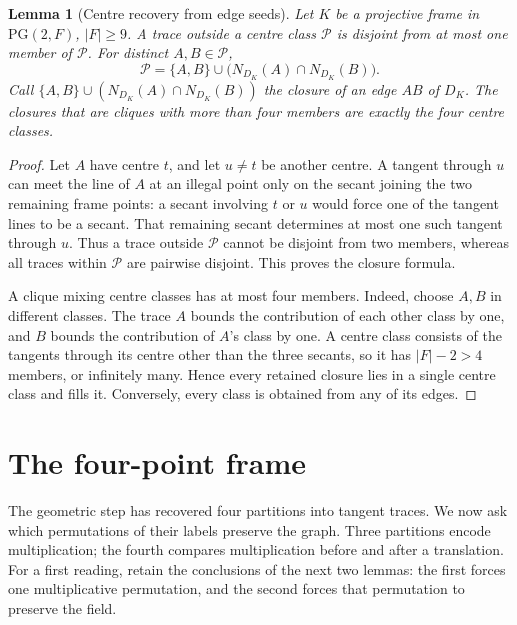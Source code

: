 \documentclass[11pt]{article}
\newtheorem{lemma}[theorem]{Lemma}
\theoremstyle{definition}
\theoremstyle{remark}
\newcommand{\PG}{\mathrm{PG}}
\begin{document}
\begin{lemma}[Centre recovery from edge seeds]\label{lem:centre-seeds}
Let $K$ be a projective frame in $\PG(2,F)$, $|F|\ge9$. A trace outside a
centre class $\mathcal P$ is disjoint from at most one member of
$\mathcal P$. For distinct $A,B\in\mathcal P$,
\[
 \mathcal P=\{A,B\}\cup\bigl(N_{D_K}(A)\cap N_{D_K}(B)\bigr).
\]
Call $\{A,B\}\cup(N_{D_K}(A)\cap N_{D_K}(B))$ the closure of an edge
$AB$ of $D_K$. The closures that are cliques with more than four
members are exactly the four centre classes.
\end{lemma}
\begin{proof}
Let $A$ have centre $t$, and let $u\ne t$ be another centre. A tangent
through $u$ can meet the line of $A$ at an illegal point only on the
secant joining the two remaining frame points: a secant involving $t$
or $u$ would force one of the tangent lines to be a secant. That
remaining secant determines at most one such tangent through $u$.
Thus a trace outside $\mathcal P$ cannot be disjoint from two members,
whereas all traces within $\mathcal P$ are pairwise disjoint. This proves
the closure formula.

A clique mixing centre classes has at most four members. Indeed, choose
$A,B$ in different classes. The trace $A$ bounds the contribution of
each other class by one, and $B$ bounds the contribution of $A$'s class
by one. A centre class consists of the tangents through its centre
other than the three secants, so it has $|F|-2>4$ members, or infinitely
many. Hence every retained closure lies in a single centre class and
fills it. Conversely, every class is obtained from any of its edges.
\end{proof}

\section{The four-point frame}
\label{sec:frame}

The geometric step has recovered four partitions into tangent traces.
We now ask which permutations of their labels preserve the graph. Three
partitions encode
multiplication; the fourth compares multiplication before and after a
translation. For a first reading, retain the conclusions of the next two
lemmas: the first forces one multiplicative permutation, and the second
forces that permutation to preserve the field.
\end{document}
